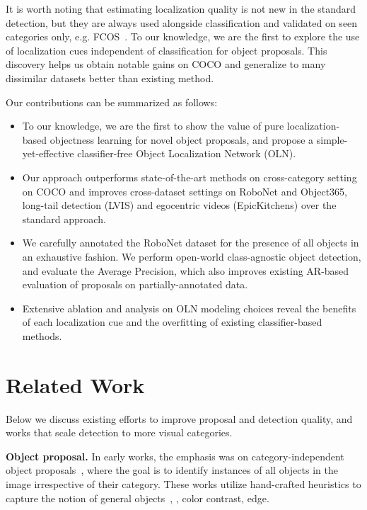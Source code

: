 \documentclass[10pt,twocolumn,letterpaper]{article}
\begin{document}
It is worth noting that estimating localization quality  is  not  new  in  the  standard  detection,  but  they  are always used alongside classification and validated on seen categories only, e.g.  FCOS~\cite{tian2019fcos}. To our knowledge, we are the first to explore the use of localization cues independent of classification for object proposals. This discovery helps us obtain notable gains on COCO and generalize to many dissimilar datasets better than existing method.

Our contributions can be summarized as follows: 
\begin{itemize}
\item To our knowledge, we are the first to show the value of pure localization-based objectness learning for novel object proposals, and propose a simple-yet-effective classifier-free Object Localization Network (OLN).
\item Our approach outperforms state-of-the-art methods on cross-category setting on COCO and improves cross-dataset settings on RoboNet and Object365, long-tail detection (LVIS) and egocentric videos (EpicKitchens) over the standard approach.
\item We carefully annotated the RoboNet dataset for the presence of all objects in an exhaustive  fashion. We perform open-world class-agnostic object detection, and evaluate the Average Precision, which also improves existing AR-based evaluation of proposals on partially-annotated data.
\item Extensive ablation and analysis on OLN modeling choices reveal the benefits of each localization cue and the overfitting of existing classifier-based methods.
\end{itemize}

\section{Related Work}
Below we discuss existing efforts to improve proposal and detection quality, and works that scale detection to more visual categories.


\noindent\textbf{Object proposal.}\quad
In early works, the emphasis was on category-independent object proposals~\cite{alexe2012measuring,arbelaez2014multiscale,endres2013category,manen2013prime, zitnick2014edge}, where the goal is to identify instances of all objects in the image irrespective of their category. These works utilize hand-crafted heuristics to capture the notion of general objects~\cite{uijlings2013selective, zitnick2014edge}, \ie, color contrast, edge. 
\end{document}
